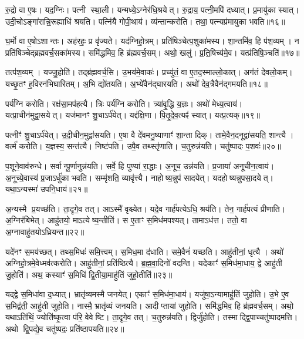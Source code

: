 रु॒द्रो वा ए॒षः।
यद॒ग्निः।
पत्नी स्था॒ली।
यन्मध्ये॒\-ऽग्नेर॑धि॒श्रयेत्।
रु॒द्राय॒ पत्नी॒मपि॑ दध्यात्।
प्र॒मायु॑का स्यात्।
उदी॒चो\-ऽङ्गा॑रान्नि॒रूह्याधि॑ श्रयति।
पत्नि॑यै गोपी॒थाय॑।
व्य॑न्तान्करोति।
तथा॒ पत्न्यप्र॑मायुका भवति॥१६॥

घ॒र्मो वा ए॒षो\-ऽशान्तः।
अह॑रहः॒ प्र वृ॑ज्यते।
यद॑ग्निहो॒त्रम्।
प्रति॑षिञ्चेत्प॒शुका॑मस्य।
शा॒न्तमि॑व॒ हि प॑श॒व्यम्।
न प्रति॑षिञ्चेद्ब्रह्मवर्च॒सका॑मस्य।
समि॑द्धमिव॒ हि ब्र॑ह्मवर्च॒सम्।
अथो॒ खलु॑।
प्र॒ति॒षिच्य॑मे॒व।
यत्प्र॑तिषि॒ञ्चति॑॥१७॥

तत्प॑श॒व्यम्।
यज्जु॒होति॑।
तद्ब्र॑ह्मवर्च॒सि।
उ॒भय॑मे॒वाकः॑।
प्रच्यु॑तं॒ वा ए॒तद॒स्माल्लो॒कात्।
अग॑तं देवलो॒कम्।
यच्छृ॒तꣳ ह॒विरन॑भिघारितम्।
अ॒भि द्यो॑तयति।
अ॒भ्ये॑वैन॑द्\mbox{}घारयति।
अथो॑ देव॒त्रैवैन॑द्गमयति॥१८॥

पर्य॑ग्नि करोति।
रक्ष॑सा॒मप॑हत्यै।
त्रिः पर्य॑ग्नि करोति।
त्र्या॑वृ॒द्धि य॒ज्ञः।
अथो॑ मेध्य॒त्वाय॑।
यत्प्रा॒चीन॑मुद्वा॒सयेत्।
यज॑मानꣳ शु॒चा\-ऽर्प॑येत्।
यद्द॑क्षि॒णा।
पि॒तृ॒दे॒व॒त्यꣴ॑ स्यात्।
यत्प्र॒त्यक्॥१९॥

पत्नीꣳ॑ शु॒चा\-ऽर्प॑येत्।
उ॒दी॒चीन॒मुद्वा॑सयति।
ए॒षा वै दे॑वमनु॒ष्याणाꣳ॑ शा॒न्ता दिक्।
तामे॒वैन॒दनूद्वा॑सयति॒ शान्त्यै।
वर्त्म॑ करोति।
य॒ज्ञस्य॒ सन्त॑त्यै।
निष्ट॑पति।
उपै॒व तथ्स्तृ॑णाति।
च॒तुरुन्न॑यति।
चतु॑ष्पादः प॒शवः॑॥२०॥

प॒शूने॒वाव॑रुन्धे।
सर्वान्पू॒र्णानुन्न॑यति।
सर्वे॒ हि पुण्या॑ रा॒द्धाः।
अ॒नूच॒ उन्न॑यति।
प्र॒जाया॑ अनूचीन॒त्वाय॑।
अ॒नूच्ये॒वास्य॑ प्र॒जा\-ऽर्धु॑का भवति।
सम्मृ॑शति॒ व्यावृ॑त्त्यै।
नाहोष्य॒न्नुप॑ सादयेत्।
यदहोष्यन्नुपसा॒दयेत्।
यथा॒ऽन्यस्मा॑ उपनि॒धाय॑॥२१॥

अ॒न्यस्मै प्र॒यच्छ॑ति।
ता॒दृगे॒व तत्।
आऽस्मै॑ वृश्च्येत।
यदे॒व गार्\mbox{}ह॑पत्येऽधि॒ श्रय॑ति।
तेन॒ गार्\mbox{}ह॑पत्यं प्रीणाति।
अ॒ग्निर॑बिभेत्।
आहु॑तयो॒ माऽत्येष्य॒न्तीति॑।
स ए॒ताꣳ स॒मिध॑मपश्यत्।
तामाऽध॑त्त।
ततो॒ वा अ॒ग्नावाहु॑तयो\-ऽध्रियन्त॥२२॥

यदे॑नꣳ स॒मय॑च्छत्।
तथ्स॒मिधः॑ समि॒त्त्वम्।
स॒मिध॒मा द॑धाति।
समे॒वैनं॑ यच्छति।
आहु॑तीनां॒ धृत्यै।
अथो॑ अग्निहो॒त्रमे॒वेध्मव॑त्करोति।
आहु॑तीनां॒ प्रति॑ष्ठित्यै।
ब्र॒ह्म॒वा॒दिनो॑ वदन्ति।
यदेकाꣳ॑ स॒मिध॑मा॒धाय॒ द्वे आहु॑ती जु॒होति॑।
अथ॒ कस्याꣳ॑ स॒मिधि॑ द्वि॒तीया॒माहु॑तिं जुहो॒तीति॑॥२३॥

यद्द्वे स॒मिधा॑वा द॒ध्यात्।
भ्रातृ॑व्यमस्मै जनयेत्।
एकाꣳ॑ स॒मिध॑मा॒धाय॑।
यजु॑षा॒\-ऽन्यामाहु॑तिं जुहोति।
उ॒भे ए॒व स॒मिद्व॑ती॒ आहु॑ती जुहोति।
नास्मै॒ भ्रातृ॑व्यं जनयति।
आदीप्तायां जुहोति।
समि॑द्धमिव॒ हि ब्र॑ह्मवर्च॒सम्।
अथो॒ यथा\-ऽति॑थिं॒ ज्योति॑ष्कृ॒त्वा प॑रि॒ वेवेष्टि।
ता॒दृगे॒व तत्।
च॒तुरुन्न॑यति।
द्विर्जु॑होति।
तस्माद्द्वि॒पाच्चतु॑ष्पादमत्ति।
अथो द्वि॒पद्ये॒व चतु॑ष्पदः॒ प्रति॑ष्ठापयति॥२४॥

